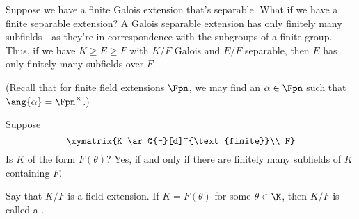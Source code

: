 \begin{ex}[]
    Suppose we have a finite Galois extension that's separable. What if we have a finite separable extension? A Galois separable extension has only finitely many subfields---as they're in correspondence with the subgroups of a finite group. Thus, if we have $K \ge E \ge F$ with $K/F$ Galois and $E/F$ separable, then $E$ has only finitely many subfields over $F$.

    (Recall that for finite field extensions $\Fpn$, we may find an $\alpha \in \Fpn$ such that $\ang{\alpha} = \Fpn^\times$.)
\end{ex}

\begin{prop}
    Suppose 
    \[
        \xymatrix{K \ar@{-}[d]^{\text{finite}}\\ F}
    \]
    Is $K$ of the form $F(\theta)$? Yes, if and only if there are finitely many subfields of $K$ containing $F$.
\end{prop}

\begin{defn}
    Say that $K/F$ is a field extension. If $K = F(\theta)$ for some $\theta \in \K$, then $K/F$ is called a . 
\end{defn}

